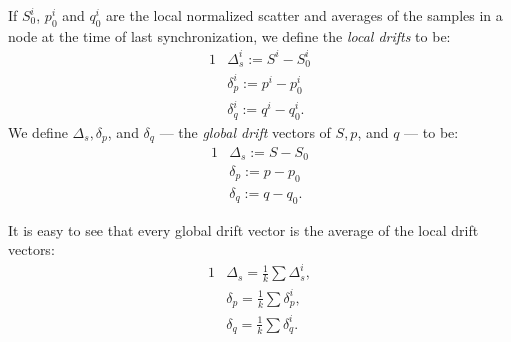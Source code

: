 If $S_0^i$, $p_0^i$ and $q_0^i$ are the local normalized scatter and averages
of the samples in a node at the time of last synchronization, we define the \textit{local drifts} to be:
\begin{alignat*}{1}
& \Delta_s^i:= S^i - S_0^i
\\ & \delta_p^i:= p^i - p_0^i
\\ & \delta_q^i:= q^i - q_0^i.
\end{alignat*}
We define $\Delta_s, \delta_p$, and $\delta_q$ --- the \textit{global drift} vectors of $S, p$, and $q$ --- to be:
\begin{alignat*}{1}
& \Delta_s:= S - S_0 \\
& \delta_p:= p - p_0 \\
& \delta_q := q - q_0.
\end{alignat*}

\begin{remark} \label{average}
It is easy to see that every global drift vector is the average of the local drift vectors:
\begin{alignat*}{1}
& \Delta_s = \frac{1}{k} \sum \Delta_s^i, \\
& \delta_p = \frac{1}{k} \sum \delta_p^i, \\
& \delta_q = \frac{1}{k} \sum \delta_q^i.
\end{alignat*}

\end{remark}


